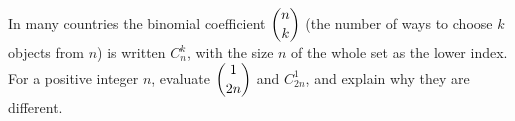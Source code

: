 In many countries the binomial coefficient $\dbinom nk$ (the number of ways to choose $k$ objects from $n$) is written $C_n^k$, with the size $n$ of the whole set as the lower index. For a positive integer $n$, evaluate $\dbinom{1}{2n}$ and $C_{2n}^{1}$, and explain why they are different.
